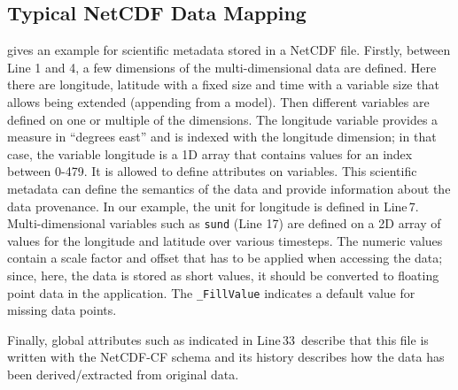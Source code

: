 \subsection{Typical NetCDF Data Mapping}
\label{sec:netcdfDataMapping}
 gives an example for scientific metadata stored in a NetCDF file.
Firstly, between Line 1 and 4, a few dimensions of the multi-dimensional data are defined.
Here there are longitude, latitude with a fixed size and time with a variable size that allows being extended (appending from a model).
Then different variables are defined on one or multiple of the dimensions.
The longitude variable provides a measure in “degrees east” and is indexed with the longitude dimension; in that case, the variable longitude is a 1D array that contains values for an index between 0-479.
It is allowed to define attributes on variables. This scientific metadata can define the semantics of the data and provide information about the data provenance.
In our example, the unit for longitude is defined in Line\,7.
Multi-dimensional variables such as \texttt{sund} (Line 17) are defined on a 2D array of values for the longitude and latitude over various timesteps.
The numeric values contain a scale factor and offset that has to be applied when accessing the data; since, here, the data is stored as short values, it should be converted to floating point data in the application.
The \texttt{\_FillValue} indicates a default value for missing data points.

Finally, global attributes such as indicated in Line\,33\, describe that this file is written with the NetCDF-CF schema and its history describes how the data has been derived/extracted from original data.

